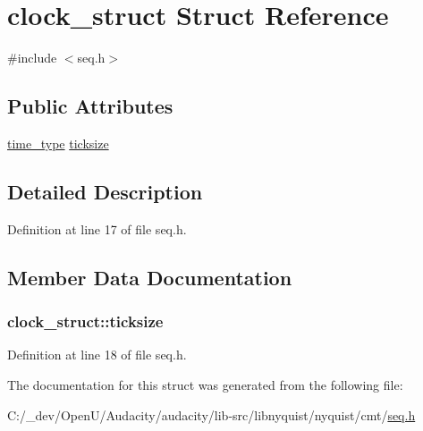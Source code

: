 \hypertarget{structclock__struct}{}\section{clock\+\_\+struct Struct Reference}
\label{structclock__struct}


{\ttfamily \#include $<$seq.\+h$>$}

\subsection*{Public Attributes}
\begin{DoxyCompactItemize}
\item 
\hyperlink{midifns_8h_a3f787491db5dbc75c21b27d54e9ebae6}{time\+\_\+type} \hyperlink{structclock__struct_a6c25521841ffda4c2911b4e9e1fa5f57}{ticksize}
\end{DoxyCompactItemize}


\subsection{Detailed Description}


Definition at line 17 of file seq.\+h.



\subsection{Member Data Documentation}
\subsubsection[{\texorpdfstring{ticksize}{ticksize}}]{ clock\+\_\+struct\+::ticksize}\hypertarget{structclock__struct_a6c25521841ffda4c2911b4e9e1fa5f57}{}\label{structclock__struct_a6c25521841ffda4c2911b4e9e1fa5f57}


Definition at line 18 of file seq.\+h.



The documentation for this struct was generated from the following file\+:\begin{DoxyCompactItemize}
\item 
C\+:/\+\_\+dev/\+Open\+U/\+Audacity/audacity/lib-\/src/libnyquist/nyquist/cmt/\hyperlink{seq_8h}{seq.\+h}\end{DoxyCompactItemize}
